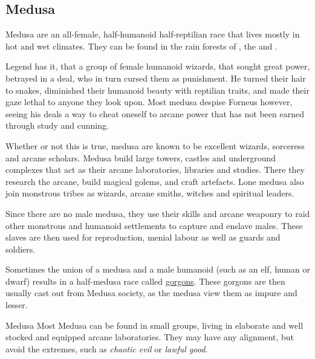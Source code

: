 \subsection{Medusa}
\label{sec:Medusa}

Medusa are an all-female, half-humanoid half-reptilian race that lives
mostly in hot and wet climates. They can be found in the rain forests of
, the  and .

Legend has it, that a group of female humanoid wizards, that sought great
power, betrayed  in a deal, who in turn cursed them as
punishment. He turned their hair to snakes, diminished their humanoid beauty
with reptilian traits, and made their gaze lethal to anyone they look upon.
Most medusa despise Forneus however, seeing his deals a way to cheat oneself
to arcane power that has not been earned through study and cunning.

Whether or not this is true, medusa are known to be excellent wizards,
sorceress and arcane scholars. Medusa build large towers, castles and
underground complexes that act as their arcane laboratories, libraries and
studies. There they research the arcane, build magical golems, and craft
artefacts. Lone medusa also join monstrous tribes as wizards, arcane smiths,
witches and spiritual leaders.

Since there are no male medusa, they use their skills and arcane weaponry
to raid other monstrous and humanoid settlements to capture and enslave
males. These slaves are then used for reproduction, menial labour as well as
guards and soldiers.

Sometimes the union of a medusa and a male humanoid (such as an elf, human or
dwarf) results in a half-medusa race called \hyperref[sec:Gorgons]{gorgons}.
These gorgons are then usually cast out from Medusa society, as the medusa
view them as impure and lesser.

\begin{35e}{Medusa}
  Most Medusa can be found in small groups, living in elaborate and well
  stocked and equipped arcane laboratories. They may have any alignment, but
  avoid the extremes, such as \emph{chaotic evil} or \emph{lawful good}.
\end{35e}
